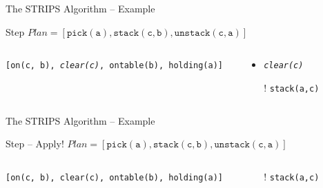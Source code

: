 \documentclass[presentation]{beamer}\mode<presentation>{\usetheme{AMSBolognaFC}}
\begin{document}
\begin{frame}[c]{The STRIPS Algorithm -- Example}
\small

\begin{exampleblock}{Step \nextStripsExampleStep{} \hfill $Plan = [\mathtt{pick(a),stack(c,b),unstack(c,a)}]$}
    \begin{columns}[t]
        \begin{column}{.30\linewidth}\centering
            \alert{\texttt{[on(c, b), \emph{clear(c)}, ontable(b), holding(a)]}}
        \end{column}
        \begin{column}{.50\linewidth}\centering
            \begin{itemize}
                \item \alert{\emph{\texttt{clear(c)}}}
                \item[!] \texttt{stack(a,c)}
            \end{itemize}
        \end{column}
        \begin{column}{.10\linewidth}\centering
            
        \end{column}
    \end{columns}
\end{exampleblock}

\end{frame}

\begin{frame}[c]{The STRIPS Algorithm -- Example}
\small

\begin{exampleblock}{Step \nextStripsExampleStep{} -- Apply! \hfill $Plan = [\mathtt{pick(a),stack(c,b),unstack(c,a)}]$}
    \begin{columns}[t]
        \begin{column}{.30\linewidth}\centering
            \texttt{[on(c, b), clear(c), ontable(b), holding(a)]}
        \end{column}
        \begin{column}{.50\linewidth}\centering
            \begin{itemize}
                \item[!] \texttt{stack(a,c)}
            \end{itemize}
        \end{column}
        \begin{column}{.10\linewidth}\centering
            
        \end{column}
    \end{columns}
\end{exampleblock}

\end{frame}
\end{document}
